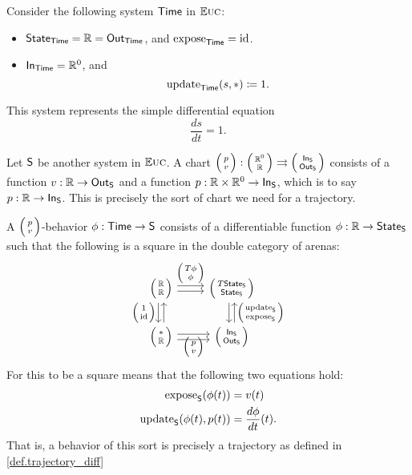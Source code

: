 \documentclass[DynamicalBook]{subfiles}
\begin{document}
\begin{example}
  Consider the following system $\mathsf{Time}$ in $\mathbb{E}\textsc{uc}$:  \begin{itemize}
    \item $\mathsf{State}_{\mathsf{Time}} = \mathbb{R} = \mathsf{Out}_{\mathsf{Time}}$, and $\mathrm{expose}_{\mathsf{Time}} = \mathrm{id}$.
    \item $\mathsf{In}_{\mathsf{Time}} = \mathbb{R}^0$, and
      $$\mathrm{update}_{\mathsf{Time}}(s, \ast) \coloneqq 1.$$
  \end{itemize}
  This system represents the simple differential equation
  $$\frac{ds}{dt} = 1.$$

  Let $\mathsf{S}$ be another system in $\mathbb{E}\textsc{uc}$. A chart $\lens{p}{v} :
  \lens{\rr^0}{\rr} \rightrightarrows \lens{\In{S}}{\Out{S}}$ consists of a
  function $v : \mathbb{R} \to \mathsf{Out}_{\mathsf{S}}$ and a function $p : \mathbb{R} \times \mathbb{R}^0 \to
  \mathsf{In}_{\mathsf{S}}$, which is to say $p : \mathbb{R} \to \mathsf{In}_{\mathsf{S}}$. This is precisely the sort of
  chart we need for a trajectory.


  A $\lens{p}{v}$-behavior $\phi : \mathsf{Time}
  \to \mathsf{S}$ consists of a differentiable function $\phi : \mathbb{R} \to \mathsf{State}_{\mathsf{S}}$
  such that the following is a square in the double category of arenas:
  \[
    \begin{tikzcd}
      \lens{\rr}{\rr} \ar[r, shift left, "\lens{T\phi}{\phi}"] \ar[r, shift right] \ar[d, shift right,
      "\lens{1}{\id}"'] \ar[d, shift left, leftarrow] &
      \lens{T\State{S}}{\State{S}} \ar[d, shift left, leftarrow,
      "\lens{\update{S}}{\expose{S}}"] \ar[d, shift right]\\
      \lens{{\ast}}{\rr} \ar[r, shift right] \ar[r,
      shift left, "\lens{p}{v}"'] & \lens{\In{S}}{\Out{S}}
    \end{tikzcd}
  \]
  For this to be a square means that the following two equations hold:
  \begin{align*}
    \mathrm{expose}_{\mathsf{S}}(\phi(t)) &= v(t)\\
    \mathrm{update}_{\mathsf{S}}(\phi(t), p(t)) &= \frac{d\phi}{dt}(t).
  \end{align*}
  That is, a behavior of this sort is precisely a trajectory as defined in
  \cref{def.trajectory_diff}
\end{example}
\end{document}
